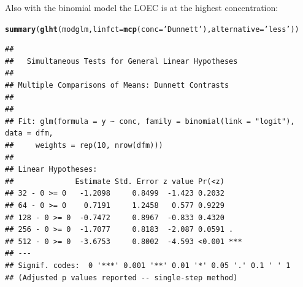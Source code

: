 \documentclass{scrartcl}\usepackage[]{graphicx}\usepackage[]{color}
\makeatletter
\newcommand{\hlstr}[1]{\textcolor[rgb]{0.192,0.494,0.8}{#1}}%
\newcommand{\hlstd}[1]{\textcolor[rgb]{0.345,0.345,0.345}{#1}}%
\newcommand{\hlkwc}[1]{\textcolor[rgb]{0.333,0.667,0.333}{#1}}%
\newcommand{\hlkwd}[1]{\textcolor[rgb]{0.737,0.353,0.396}{\textbf{#1}}}%
\newenvironment{kframe}{%
 \def\at@end@of@kframe{}%
 \ifinner\ifhmode%
  \def\at@end@of@kframe{\end{minipage}}%
  \begin{minipage}{\columnwidth}%
 \fi\fi%
 \def\FrameCommand##1{\hskip\@totalleftmargin \hskip-\fboxsep
 \colorbox{shadecolor}{##1}\hskip-\fboxsep
     \hskip-\linewidth \hskip-\@totalleftmargin \hskip\columnwidth}%
 \MakeFramed {\advance\hsize-\width
   \@totalleftmargin\z@ \linewidth\hsize
   \@setminipage}}%
 {\par\unskip\endMakeFramed%
 \at@end@of@kframe}
\newenvironment{knitrout}{}{} %
\makeatother
\begin{document}
Also with the binomial model the LOEC is at the highest concentration:
\begin{knitrout}
\color{fgcolor}\begin{kframe}
\begin{alltt}
\hlkwd{summary}\hlstd{(}\hlkwd{glht}\hlstd{(modglm,} \hlkwc{linfct} \hlstd{=} \hlkwd{mcp}\hlstd{(}\hlkwc{conc} \hlstd{=} \hlstr{'Dunnett'}\hlstd{),} \hlkwc{alternative} \hlstd{=} \hlstr{'less'}\hlstd{))}
\end{alltt}
\begin{verbatim}
## 
## 	 Simultaneous Tests for General Linear Hypotheses
## 
## Multiple Comparisons of Means: Dunnett Contrasts
## 
## 
## Fit: glm(formula = y ~ conc, family = binomial(link = "logit"), data = dfm, 
##     weights = rep(10, nrow(dfm)))
## 
## Linear Hypotheses:
##              Estimate Std. Error z value Pr(<z)    
## 32 - 0 >= 0   -1.2098     0.8499  -1.423 0.2032    
## 64 - 0 >= 0    0.7191     1.2458   0.577 0.9229    
## 128 - 0 >= 0  -0.7472     0.8967  -0.833 0.4320    
## 256 - 0 >= 0  -1.7077     0.8183  -2.087 0.0591 .  
## 512 - 0 >= 0  -3.6753     0.8002  -4.593 <0.001 ***
## ---
## Signif. codes:  0 '***' 0.001 '**' 0.01 '*' 0.05 '.' 0.1 ' ' 1
## (Adjusted p values reported -- single-step method)
\end{verbatim}
\end{kframe}
\end{knitrout}









\end{document}
